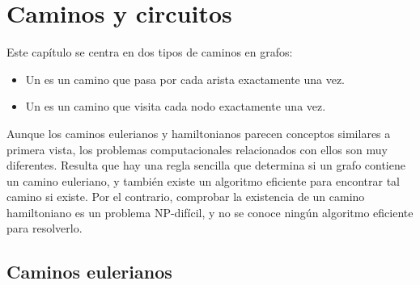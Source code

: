 \chapter{Caminos y circuitos}

Este capítulo se centra en dos tipos de caminos en grafos:
\begin{itemize}
\item Un  es un camino que
pasa por cada arista exactamente una vez.
\item Un  es un camino
que visita cada nodo exactamente una vez.
\end{itemize}

Aunque los caminos eulerianos y hamiltonianos parecen
conceptos similares a primera vista,
los problemas computacionales relacionados con ellos
son muy diferentes.
Resulta que hay una regla sencilla que
determina si un grafo contiene un camino euleriano,
y también existe un algoritmo eficiente para
encontrar tal camino si existe.
Por el contrario, comprobar la existencia de un camino hamiltoniano es un problema
NP-difícil, y no se conoce ningún algoritmo eficiente para resolverlo.

\section{Caminos eulerianos}


